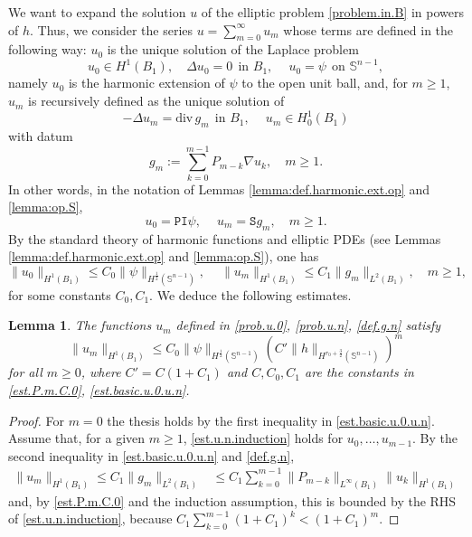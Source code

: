 \documentclass[10pt,reqno,a4paper]{article}
\numberwithin{equation}{section}
\theoremstyle{plain}
\newtheorem{lemma}[theorem]{Lemma}
\theoremstyle{definition}
\renewcommand{\S}{{\mathbb S}}
\renewcommand{\div}{\mathrm{div}\,}
\newcommand{\grad}{\nabla}
\begin{document}
We want to expand the solution $u$ of the elliptic problem \eqref{problem.in.B} in powers of $h$. 
Thus, we consider the series $u = \sum_{m=0}^\infty u_m$ whose terms are defined 
in the following way: $u_0$ is the unique solution of the Laplace problem
\begin{equation} \label{prob.u.0}
u_0 \in H^1(B_1), \quad 
\Delta u_0 = 0 \ \  \text{in } B_1, \quad \ 
u_0 = \psi \ \ \text{on } \S^{n-1},
\end{equation} 
namely $u_0$ is the harmonic extension of $\psi$ to the open unit ball,  
and, for $m \geq 1$, $u_m$ is recursively defined as the unique solution of 
\begin{equation} \label{prob.u.n}
- \Delta u_m = \div g_m  \ \  \text{in } B_1, \quad \ 
u_m \in H^1_0(B_1)
\end{equation} 
with datum 
\begin{equation}  \label{def.g.n}
g_m := \sum_{k=0}^{m-1} P_{m-k} \grad u_k, 
\quad m \geq 1.
\end{equation}
In other words, in the notation of Lemmas 
\ref{lemma:def.harmonic.ext.op} and \ref{lemma:op.S}, 
\begin{equation} \label{pinoli.formula.u.m}
u_0 = \mathtt{PI} \psi, \quad \ 
u_m = \mathtt{S} g_m, \quad m \geq 1.
\end{equation}
By the standard theory of harmonic functions and elliptic PDEs 
(see Lemmas \ref{lemma:def.harmonic.ext.op} and \ref{lemma:op.S}), one has 
\begin{equation}  \label{est.basic.u.0.u.n}
\| u_0 \|_{H^1(B_1)} \leq C_0 \| \psi \|_{H^{\frac12}(\S^{n-1})}, 
\quad \ 
\| u_m \|_{H^1(B_1)} \leq C_1 \| g_m \|_{L^2(B_1)}, \quad m \geq 1,
\end{equation}
for some constants $C_0, C_1$.  
We deduce the following estimates. 

\begin{lemma} \label{lemma:olive.low}
The functions $u_m$ defined in \eqref{prob.u.0}, \eqref{prob.u.n}, \eqref{def.g.n} satisfy
\begin{equation} \label{est.u.n.induction}
\| u_m \|_{H^1(B_1)} 
\leq C_0 \| \psi \|_{H^{\frac12}(\S^{n-1})} (C' \| h \|_{H^{r_0+\frac32}(\S^{n-1})})^m 
\end{equation}
for all $m \geq 0$, where 
$C' = C(1+C_1)$  
and $C, C_0, C_1$ are the constants in \eqref{est.P.m.C.0}, \eqref{est.basic.u.0.u.n}. 
\end{lemma}

\begin{proof}
For $m=0$ the thesis holds by the first inequality in \eqref{est.basic.u.0.u.n}. 
Assume that, for a given $m \geq 1$, \eqref{est.u.n.induction} holds for $u_0, \ldots, u_{m-1}$. 
By the second inequality in \eqref{est.basic.u.0.u.n} and \eqref{def.g.n}, 
\begin{align} 
\| u_m \|_{H^1(B_1)} 
\leq C_1 \| g_m \|_{L^2(B_1)} 
& \leq C_1 \sum_{k=0}^{m-1} \| P_{m-k} \|_{L^\infty(B_1)} \| u_k \|_{H^1(B_1)}
\label{est.g.n}
\end{align}
and, by \eqref{est.P.m.C.0} and the induction assumption, 
this is bounded by the RHS of \eqref{est.u.n.induction}, 
because $C_1 \sum_{k=0}^{m-1} (1+C_1)^k < (1+C_1)^m$.
\end{proof}
\end{document}
